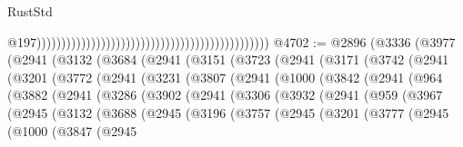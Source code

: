 \begin{lexlean}{RustStd}
\begin{coremodule}
                                                                                                  @197)))))))))))))))))))))))))))))))))))))))))))))))
@4702 := @2896
    (@3336
      (@3977
        (@2941
          (@3132
            (@3684
              (@2941
                (@3151
                  (@3723
                    (@2941
                      (@3171
                        (@3742
                          (@2941
                            (@3201
                              (@3772
                                (@2941
                                  (@3231
                                    (@3807
                                      (@2941
                                        (@1000
                                          (@3842
                                            (@2941
                                              (@964
                                                (@3882
                                                  (@2941
                                                    (@3286
                                                      (@3902
                                                        (@2941
                                                          (@3306
                                                            (@3932
                                                              (@2941
                                                                (@959
                                                                  (@3967
                                                                    (@2945
                                                                      (@3132
                                                                        (@3688
                                                                          (@2945
                                                                            (@3196
                                                                              (@3757
                                                                                (@2945
                                                                                  (@3201
                                                                                    (@3777
                                                                                      (@2945
                                                                                        (@1000
                                                                                          (@3847
                                                                                            (@2945

\end{coremodule}
\end{lexlean}

